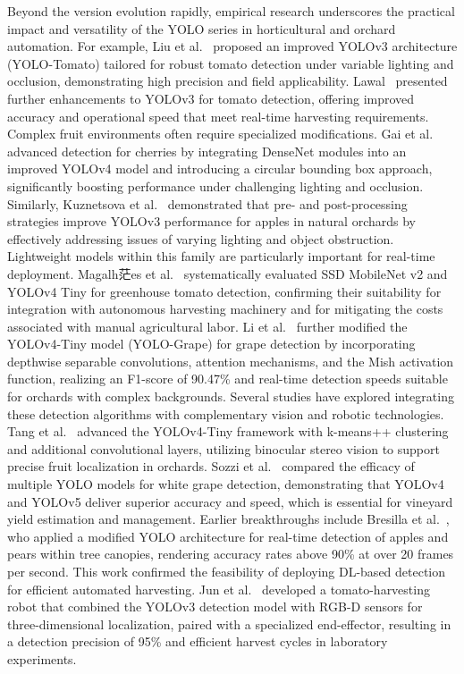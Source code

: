 \documentclass[a4paper,fleqn]{cas-dc}
\begin{document}
Beyond the version evolution rapidly, empirical research underscores the practical impact and versatility of the YOLO series in horticultural and orchard automation. For example, Liu et al.~\cite{liu2020yolo} proposed an improved YOLOv3 architecture (YOLO-Tomato) tailored for robust tomato detection under variable lighting and occlusion, demonstrating high precision and field applicability. Lawal~\cite{lawal2021tomato} presented further enhancements to YOLOv3 for tomato detection, offering improved accuracy and operational speed that meet real-time harvesting requirements.
Complex fruit environments often require specialized modifications. Gai et al.~\cite{gai2023detection} advanced detection for cherries by integrating DenseNet modules into an improved YOLOv4 model and introducing a circular bounding box approach, significantly boosting performance under challenging lighting and occlusion. Similarly, Kuznetsova et al.~\cite{kuznetsova2020using} demonstrated that pre- and post-processing strategies improve YOLOv3 performance for apples in natural orchards by effectively addressing issues of varying lighting and object obstruction.
Lightweight models within this family are particularly important for real-time deployment. Magalh茫es et al.~\cite{magalhaes2021evaluating} systematically evaluated SSD MobileNet v2 and YOLOv4 Tiny for greenhouse tomato detection, confirming their suitability for integration with autonomous harvesting machinery and for mitigating the costs associated with manual agricultural labor. Li et al.~\cite{li2021real} further modified the YOLOv4-Tiny model (YOLO-Grape) for grape detection by incorporating depthwise separable convolutions, attention mechanisms, and the Mish activation function, realizing an F1-score of 90.47\% and real-time detection speeds suitable for orchards with complex backgrounds.
Several studies have explored integrating these detection algorithms with complementary vision and robotic technologies. Tang et al.~\cite{tang2023fruit} advanced the YOLOv4-Tiny framework with k-means++ clustering and additional convolutional layers, utilizing binocular stereo vision to support precise fruit localization in orchards. Sozzi et al.~\cite{sozzi2022automatic} compared the efficacy of multiple YOLO models for white grape detection, demonstrating that YOLOv4 and YOLOv5 deliver superior accuracy and speed, which is essential for vineyard yield estimation and management.
Earlier breakthroughs include Bresilla et al.~\cite{bresilla2019single}, who applied a modified YOLO architecture for real-time detection of apples and pears within tree canopies, rendering accuracy rates above 90\% at over 20 frames per second. This work confirmed the feasibility of deploying DL-based detection for efficient automated harvesting. Jun et al.~\cite{jun2021towards} developed a tomato-harvesting robot that combined the YOLOv3 detection model with RGB-D sensors for three-dimensional localization, paired with a specialized end-effector, resulting in a detection precision of 95\% and efficient harvest cycles in laboratory experiments.
\end{document}
